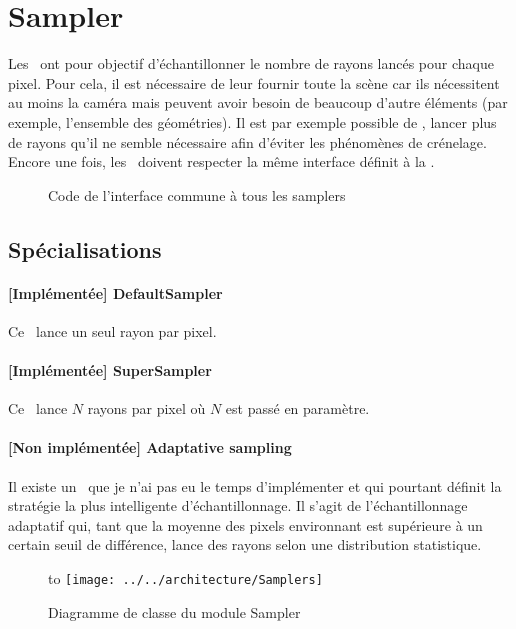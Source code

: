 \section{Sampler}
Les \ ont pour objectif d'échantillonner le nombre de rayons
lancés pour chaque pixel. Pour cela, il est nécessaire de leur fournir toute
la scène car ils nécessitent au moins la caméra mais peuvent avoir besoin de
beaucoup d'autre éléments (par exemple, l'ensemble des géométries). Il est par
exemple possible de , \ie lancer plus de rayons qu'il ne
semble nécessaire afin d'éviter les phénomènes de crénelage.\\

Encore une fois, les \ doivent respecter la même interface
définit à la .

\begin{figure}[h]
  \caption{Code de l'interface commune à tous les
  samplers\label{fig:ISamplers}}
\end{figure}

\subsection{Spécialisations}
\paragraph{[Implémentée] DefaultSampler} Ce \ lance un seul rayon
par pixel.

\paragraph{[Implémentée] SuperSampler} Ce \ lance $N$ rayons par
pixel où $N$ est passé en paramètre.

\paragraph{[Non implémentée] Adaptative sampling} Il existe un \
que je n'ai pas eu le temps d'implémenter et qui pourtant définit la stratégie
la plus intelligente d'échantillonnage. Il s'agit de l'échantillonnage
adaptatif qui, tant que la moyenne des pixels environnant est supérieure à un
certain seuil de différence, lance des rayons selon une distribution
statistique.

\vspace*{\fill}
\begin{figure}[h]
\begin{center}
  \noindent\hbox to \textwidth
  {\hss\texttt{[image: ../../architecture/Samplers]}\hss}
  \caption{Diagramme de classe du module Sampler\label{fig:CDSamplers}}
\end{center}
\end{figure}
